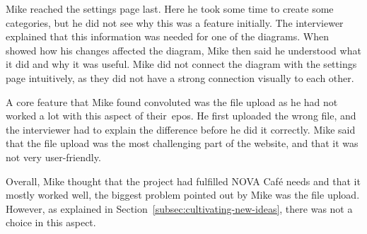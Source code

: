 Mike reached the settings page last.
Here he took some time to create some categories, but he did not see why this was a feature initially.
The interviewer explained that this information was needed for one of the diagrams.
When showed how his changes affected the diagram, Mike then said he understood what it did and why it was useful.
Mike did not connect the diagram with the settings page intuitively,
as they did not have a strong connection visually to each other.

A core feature that Mike found convoluted was the file upload as he had not worked a lot with this aspect of
their~\acrshort{epos}.
He first uploaded the wrong file, and the interviewer had to explain the difference before he
did it correctly.
Mike said that the file upload was the most challenging part of the website, and that it was not very user-friendly.

Overall, Mike thought that the project had fulfilled NOVA Café needs and that it mostly worked well, the biggest problem
pointed out by Mike was the file upload.
However, as explained in Section~\ref{subsec:cultivating-new-ideas}, there was not a choice in this aspect.
